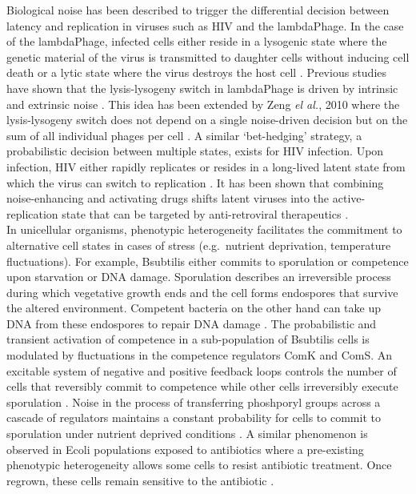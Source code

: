 Biological noise has been described to trigger the differential decision between latency and replication in viruses such as \Gls{HIV} and the \gls{lambdaPhage}. In the case of the \gls{lambdaPhage}, infected cells either reside in a lysogenic state where the genetic material of the virus is transmitted to daughter cells without inducing cell death or a lytic state where the virus destroys the host cell \citep{Lieb1953}. Previous studies have shown that the lysis-lysogeny switch in \gls{lambdaPhage} is driven by intrinsic and extrinsic noise \citep{Arkin1998, St-Pierre2008}. This idea has been extended by Zeng \textit{el al.}, 2010 where the lysis-lysogeny switch does not depend on a single noise-driven decision but on the sum of all individual phages per cell \citep{Zeng2010}. A similar ‘bet-hedging’ strategy, a probabilistic decision between multiple states, exists for \Gls{HIV} infection. Upon infection, \Gls{HIV} either rapidly replicates or resides in a long-lived latent state from which the virus can switch to replication \citep{Weinberger2015}. It has been shown that combining noise-enhancing and activating drugs shifts latent viruses into the active-replication state that can be targeted by anti-retroviral therapeutics \citep{Dar2014}. \\

In unicellular organisms, phenotypic heterogeneity facilitates the commitment to alternative cell states in cases of stress (e.g.~nutrient deprivation, temperature fluctuations). For example, \Gls{Bsubtilis} either commits to sporulation or competence upon starvation or DNA damage. Sporulation describes an irreversible process during which vegetative growth ends and the cell forms endospores that survive the altered environment. Competent bacteria on the other hand can take up DNA from these endospores to repair DNA damage \citep{Schultz2009}. The probabilistic and transient activation of competence in a sub-population of \Gls{Bsubtilis} cells is modulated by fluctuations in the competence regulators ComK and ComS. An excitable system of negative and positive feedback loops controls the number of cells that reversibly commit to competence while other cells irreversibly execute sporulation \citep{Suel2006}. Noise in the process of transferring phoshporyl groups across a cascade of regulators maintains a constant probability for cells to commit to sporulation under nutrient deprived conditions \citep{Russell2017}. A similar phenomenon is observed in \Gls{Ecoli} populations exposed to antibiotics where a pre-existing phenotypic heterogeneity allows some cells to resist antibiotic treatment. Once regrown, these cells remain sensitive to the antibiotic \citep{Balaban2004}. \\

